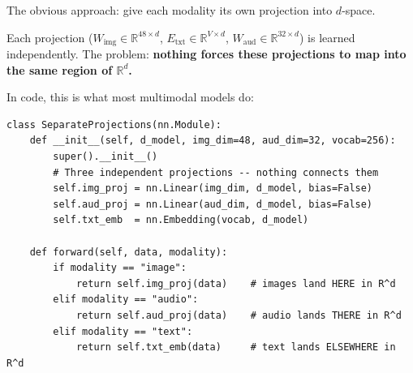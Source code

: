 \documentclass[11pt, a4paper]{article}
\newcommand{\M}{\mathbf{M}}
\newcommand{\R}{\mathbb{R}}
\theoremstyle{remark}
\begin{document}
The obvious approach: give each modality its own projection into $d$-space.

\begin{center}
\end{center}

Each projection ($W_\text{img} \in \R^{48 \times d}$, $E_\text{txt} \in \R^{V \times d}$, $W_\text{aud} \in \R^{32 \times d}$) is learned independently.
The problem: \textbf{nothing forces these projections to map into the same region of $\R^d$.}

In code, this is what most multimodal models do:

\begin{lstlisting}[caption={Separate projections: each modality gets its own map into $d$-space.}]
class SeparateProjections(nn.Module):
    def __init__(self, d_model, img_dim=48, aud_dim=32, vocab=256):
        super().__init__()
        # Three independent projections -- nothing connects them
        self.img_proj = nn.Linear(img_dim, d_model, bias=False)
        self.aud_proj = nn.Linear(aud_dim, d_model, bias=False)
        self.txt_emb  = nn.Embedding(vocab, d_model)

    def forward(self, data, modality):
        if modality == "image":
            return self.img_proj(data)    # images land HERE in R^d
        elif modality == "audio":
            return self.aud_proj(data)    # audio lands THERE in R^d
        elif modality == "text":
            return self.txt_emb(data)     # text lands ELSEWHERE in R^d
\end{lstlisting}
\end{document}

